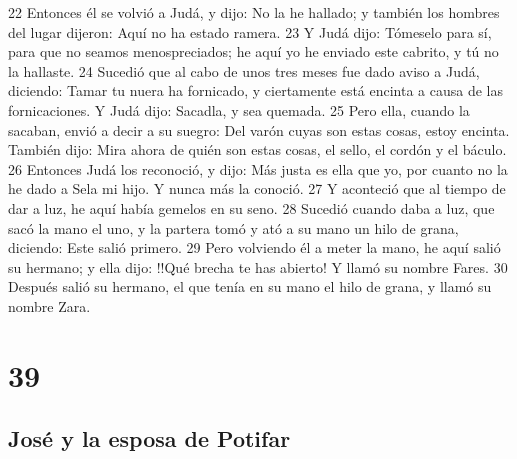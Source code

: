 22 Entonces él se volvió a Judá, y dijo: No la he hallado; y también los hombres del lugar dijeron: Aquí no ha estado ramera.
23 Y Judá dijo: Tómeselo para sí, para que no seamos menospreciados; he aquí yo he enviado este cabrito, y tú no la hallaste.
24 Sucedió que al cabo de unos tres meses fue dado aviso a Judá, diciendo: Tamar tu nuera ha fornicado, y ciertamente está encinta a causa de las fornicaciones. Y Judá dijo: Sacadla, y sea quemada.
25 Pero ella, cuando la sacaban, envió a decir a su suegro: Del varón cuyas son estas cosas, estoy encinta. También dijo: Mira ahora de quién son estas cosas, el sello, el cordón y el báculo.
26 Entonces Judá los reconoció, y dijo: Más justa es ella que yo, por cuanto no la he dado a Sela mi hijo. Y nunca más la conoció.
27 Y aconteció que al tiempo de dar a luz, he aquí había gemelos en su seno.
28 Sucedió cuando daba a luz, que sacó la mano el uno, y la partera tomó y ató a su mano un hilo de grana, diciendo: Este salió primero.
29 Pero volviendo él a meter la mano, he aquí salió su hermano; y ella dijo: !!Qué brecha te has abierto! Y llamó su nombre Fares.
30 Después salió su hermano, el que tenía en su mano el hilo de grana, y llamó su nombre Zara.

\chapter{39}

\section*{José y la esposa de Potifar}


